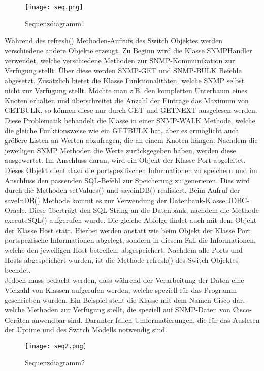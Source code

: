 \begin{figure}[H]
\centering
\texttt{[image: seq.png]}
\caption{Sequenzdiagramm1}
\label{fig:sequecediagram1}
\end{figure}

Während des refresh() Methoden-Aufrufs des Switch Objektes werden verschiedene andere Objekte erzeugt. Zu Beginn wird die Klasse SNMPHandler verwendet, welche verschiedene Methoden zur SNMP-Kommunikation zur Verfügung stellt. Über diese werden SNMP-GET und SNMP-BULK Befehle abgesetzt. Zusätzlich bietet die Klasse Funktionalitäten, welche SNMP selbst nicht zur Verfügung stellt. Möchte man z.B. den kompletten Unterbaum eines Knoten erhalten und überschreitet die Anzahl der Einträge das Maximum von GETBULK, so können diese nur durch GET und GETNEXT ausgelesen werden. Diese Problematik behandelt die Klasse in einer SNMP-WALK Methode, welche die gleiche Funktionsweise wie ein GETBULK hat, aber es ermöglicht auch größere Listen an Werten abzufragen, die an einem Knoten hängen. Nachdem die jeweiligen SNMP Methoden die Werte zurückgegeben haben, werden diese ausgewertet. Im Anschluss daran, wird ein Objekt der Klasse Port abgeleitet.
Dieses Objekt dient dazu die portspezifischen Informationen zu speichern und im Anschluss den passenden SQL-Befehl zur Speicherung zu generieren. Dies wird durch die Methoden setValues() und saveinDB() realisiert.
Beim Aufruf der saveInDB() Methode kommt es zur Verwendung der Datenbank-Klasse JDBC-Oracle. Diese überträgt den SQL-String an die Datenbank, nachdem die Methode executeSQL() aufgerufen wurde.
Die gleiche Abfolge findet auch mit dem Objekt der Klasse Host statt. Hierbei werden anstatt wie beim Objekt der Klasse Port portspezfische Informationen abgelegt, sondern in diesem Fall die Informationen, welche den jeweiligen Host betreffen, abgespeichert.
Nachdem alle Ports und Hosts abgespeichert wurden, ist die Methode refresh() des Switch-Objektes beendet.\\
Jedoch muss bedacht werden, dass während der Verarbeitung der Daten eine Vielzahl von Klassen aufgerufen werden, welche speziell für das Programm geschrieben wurden.
Ein Beispiel stellt die Klasse mit dem Namen Cisco dar, welche Methoden zur Verfügung stellt, die speziell auf SNMP-Daten von Cisco-Geräten anwendbar sind.
Darunter fallen Umformatierungen, die für das Auslesen der Uptime und des Switch Modells notwendig sind.


\begin{figure}[H]
\centering
\texttt{[image: seq2.png]}
\caption{Sequenzdiagramm2}
\label{fig:sequecediagram2}
\end{figure}

